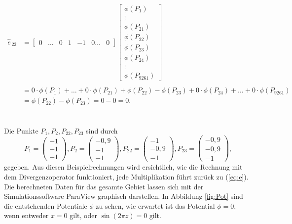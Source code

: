 \begin{equation} 
	\begin{split} 
		\overset{\frown}{e}_{22} &=  
		\begin{bmatrix} 
			0 & \dots & 0 & 1 & -1 & 0 \dots & 0 
		\end{bmatrix} 
		\begin{bmatrix} 
			\phi(P_1) \\ \vdots \\ \phi(P_{21}) \\ \phi(P_{22}) \\ \phi(P_{23}) \\ \phi(P_{24}) \\ 	\vdots 	\\ \phi(P_{9261}) 
		\end{bmatrix} 
		\\ \\ 
		&= 0\cdot\phi(P_1) + \dots + 0\cdot\phi(P_{21}) + \phi(P_{22}) - \phi(P_{23}) + 0\cdot\phi(P_{24}) + \dots + 0\cdot\phi(P_{9261}) \\ 
		&= \phi(P_{22}) - \phi(P_{23}) = 0 - 0 = 0. 
	\end{split} 
\end{equation}\\ \\ 
Die Punkte $P_1,P_2,P_{22},P_{23}$ sind durch 
\begin{equation*} 
	P_1 = \begin{pmatrix} 
	-1 \\ -1 \\ -1  
	\end{pmatrix},
	P_2 = \begin{pmatrix} 
	-0,9 \\ -1 \\ -1  
	\end{pmatrix},
	P_{22} = \begin{pmatrix} 
	-1 \\ -0,9 \\ -1
	\end{pmatrix}, 
	P_{23} = \begin{pmatrix} 
	-0,9 \\ -0,9 \\ -1  
	\end{pmatrix},
\end{equation*} gegeben. Aus diesen Beispielrechnungen wird ersichtlich, wie die Rechnung mit dem Divergenzoperator funktioniert, jede Multiplikation führt zurück zu (\ref{eq:e}). 
Die berechneten Daten für das gesamte Gebiet lassen sich mit der Simulationssoftware ParaView graphisch darstellen. In Abbildung \ref{fig:Pot} sind die entstehenden Potentiale $\phi$ zu sehen, wie erwartet ist das Potential $\phi = 0$, wenn entweder $x = 0$ gilt, oder $\sin(2\pi z) = 0$ gilt.\\ \\
